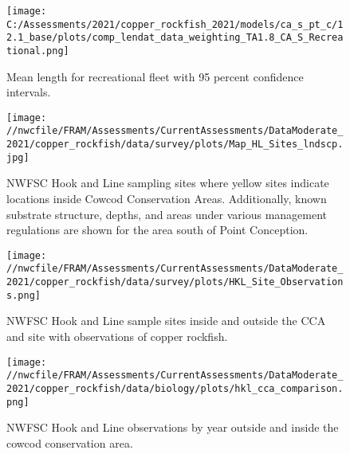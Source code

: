 \documentclass[11pt,
  english,
  a4paper,
]{article}
\begin{document}
\begin{figure}
\centering
\texttt{[image: C:/Assessments/2021/copper\_rockfish\_2021/models/ca\_s\_pt\_c/12.1\_base/plots/comp\_lendat\_data\_weighting\_TA1.8\_CA\_S\_Recreational.png]}
\caption{Mean length for recreational fleet with 95 percent confidence intervals.\label{fig:mean-rec-len-data}}
\end{figure}

\tagmcend\tagstructend


\begin{figure}
\centering
\texttt{[image: //nwcfile/FRAM/Assessments/CurrentAssessments/DataModerate\_2021/copper\_rockfish/data/survey/plots/Map\_HL\_Sites\_lndscp.jpg]}
\caption{NWFSC Hook and Line sampling sites where yellow sites indicate locations inside Cowcod Conservation Areas. Additionally, known substrate structure, depths, and areas under various management regulations are shown for the area south of Point Conception.\label{fig:hkl-sites}}
\end{figure}

\tagmcend\tagstructend


\begin{figure}
\centering
\texttt{[image: //nwcfile/FRAM/Assessments/CurrentAssessments/DataModerate\_2021/copper\_rockfish/data/survey/plots/HKL\_Site\_Observations.png]}
\caption{NWFSC Hook and Line sample sites inside and outside the CCA and site with observations of copper rockfish.\label{fig:hkl-site-ob}}
\end{figure}

\tagmcend\tagstructend


\begin{figure}
\centering
\texttt{[image: //nwcfile/FRAM/Assessments/CurrentAssessments/DataModerate\_2021/copper\_rockfish/data/biology/plots/hkl\_cca\_comparison.png]}
\caption{NWFSC Hook and Line observations by year outside and inside the cowcod conservation area.\label{fig:hkl-cca}}
\end{figure}
\end{document}
